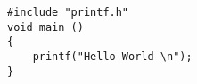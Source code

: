\documentclass{article}
\begin{document}
\begin{verbatim}
#include "printf.h"
void main ()
{
	printf("Hello World \n");
}
\end{verbatim}
\end{document}
